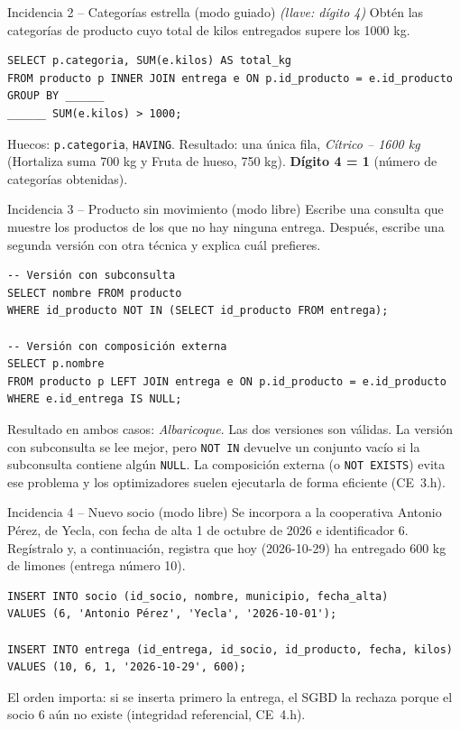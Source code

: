 \documentclass[11pt,a4paper]{article}
\begin{document}
\begin{reto}{Incidencia 2 -- Categorías estrella (modo guiado) \emph{(llave: dígito 4)}}
Obtén las categorías de producto cuyo total de kilos entregados supere los 1000 kg.
\begin{lstlisting}
SELECT p.categoria, SUM(e.kilos) AS total_kg
FROM producto p INNER JOIN entrega e ON p.id_producto = e.id_producto
GROUP BY ______
______ SUM(e.kilos) > 1000;
\end{lstlisting}
\end{reto}
\begin{solucion}
Huecos: \texttt{p.categoria}, \texttt{HAVING}.
Resultado: una única fila, \emph{Cítrico -- 1600 kg} (Hortaliza suma 700 kg y Fruta de
hueso, 750 kg). \textbf{Dígito 4 = 1} (número de categorías obtenidas).
\end{solucion}

\begin{reto}{Incidencia 3 -- Producto sin movimiento (modo libre)}
Escribe una consulta que muestre los productos de los que no hay ninguna entrega.
Después, escribe una segunda versión con otra técnica y explica cuál prefieres.
\end{reto}
\begin{solucion}
\begin{lstlisting}
-- Versión con subconsulta
SELECT nombre FROM producto
WHERE id_producto NOT IN (SELECT id_producto FROM entrega);

-- Versión con composición externa
SELECT p.nombre
FROM producto p LEFT JOIN entrega e ON p.id_producto = e.id_producto
WHERE e.id_entrega IS NULL;
\end{lstlisting}
Resultado en ambos casos: \emph{Albaricoque}. Las dos versiones son válidas. La versión con
subconsulta se lee mejor, pero \texttt{NOT IN} devuelve un conjunto vacío si la subconsulta
contiene algún \texttt{NULL}. La composición externa (o \texttt{NOT EXISTS}) evita ese
problema y los optimizadores suelen ejecutarla de forma eficiente (CE~3.h).
\end{solucion}

\begin{reto}{Incidencia 4 -- Nuevo socio (modo libre)}
Se incorpora a la cooperativa Antonio Pérez, de Yecla, con fecha de alta 1 de octubre de
2026 e identificador 6. Regístralo y, a continuación, registra que hoy (2026-10-29) ha
entregado 600 kg de limones (entrega número 10).
\end{reto}
\begin{solucion}
\begin{lstlisting}
INSERT INTO socio (id_socio, nombre, municipio, fecha_alta)
VALUES (6, 'Antonio Pérez', 'Yecla', '2026-10-01');

INSERT INTO entrega (id_entrega, id_socio, id_producto, fecha, kilos)
VALUES (10, 6, 1, '2026-10-29', 600);
\end{lstlisting}
El orden importa: si se inserta primero la entrega, el SGBD la rechaza porque el socio
6 aún no existe (integridad referencial, CE~4.h).
\end{solucion}
\end{document}
